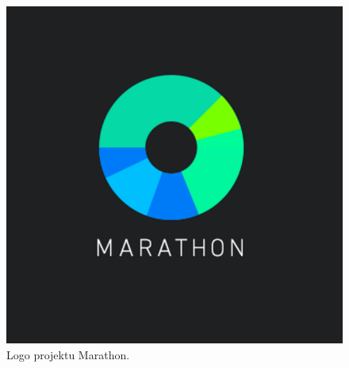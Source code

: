 \documentclass[10pt,a4paper,titlepage,twoside]{report}
\begin{document}
\begin{figure}[!h]
	\centering
	\includegraphics[scale=0.5]{pics/marathon_logo.png}
	\caption{Logo projektu Marathon.}
	\label{marathon_logo}
\end{figure}
\end{document}
